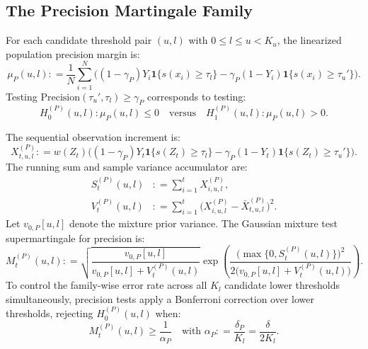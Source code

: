 \documentclass[11pt,a4paper]{article}
\newcommand{\coloneqq}{\mathrel{\mathop:}=}
\begin{document}
\subsection{The Precision Martingale Family}
For each candidate threshold pair $(u, l)$ with $0 \le l \le u < K_u$, the linearized population precision margin is:
\begin{equation}\label{eq:precision_margin}
\mu_P(u, l) \coloneqq \frac{1}{N}\sum_{i=1}^N \Big( (1 - \gamma_P) Y_i \mathbf{1}\{s(x_i) \ge \tau_l\} - \gamma_P (1 - Y_i) \mathbf{1}\{s(x_i) \ge \tau_u'\} \Big).
\end{equation}
Testing $\text{Precision}(\tau_u', \tau_l) \ge \gamma_P$ corresponds to testing:
\begin{equation}\label{eq:h0_precision}
H_0^{(P)}(u, l) : \mu_P(u, l) \le 0 \quad \text{versus} \quad H_1^{(P)}(u, l) : \mu_P(u, l) > 0.
\end{equation}

The sequential observation increment is:
\begin{equation}\label{eq:obs_precision}
X_{t, u, l}^{(P)} \coloneqq w(Z_t) \Big( (1 - \gamma_P) Y_t \mathbf{1}\{s(Z_t) \ge \tau_l\} - \gamma_P (1 - Y_t) \mathbf{1}\{s(Z_t) \ge \tau_u'\} \Big).
\end{equation}
The running sum and sample variance accumulator are:
\begin{align}
S_t^{(P)}(u, l) &\coloneqq \sum_{i=1}^t X_{i, u, l}^{(P)}, \label{eq:st_precision} \\
V_t^{(P)}(u, l) &\coloneqq \sum_{i=1}^t \big(X_{i, u, l}^{(P)} - \bar{X}_{t, u, l}^{(P)}\big)^2. \label{eq:vt_precision}
\end{align}
Let $v_{0, P}[u, l]$ denote the mixture prior variance. The Gaussian mixture test supermartingale for precision is:
\begin{equation}\label{eq:gm_precision}
M_t^{(P)}(u, l) \coloneqq \sqrt{\frac{v_{0, P}[u, l]}{v_{0, P}[u, l] + V_t^{(P)}(u, l)}} \exp\left( \frac{\big(\max\{0, S_t^{(P)}(u, l)\}\big)^2}{2\big(v_{0, P}[u, l] + V_t^{(P)}(u, l)\big)} \right).
\end{equation}
To control the family-wise error rate across all $K_l$ candidate lower thresholds simultaneously, precision tests apply a Bonferroni correction over lower thresholds, rejecting $H_0^{(P)}(u, l)$ when:
\begin{equation}\label{eq:reject_precision}
M_t^{(P)}(u, l) \ge \frac{1}{\alpha_P} \quad \text{with } \alpha_P \coloneqq \frac{\delta_P}{K_l} = \frac{\delta}{2 K_l}.
\end{equation}
\end{document}
